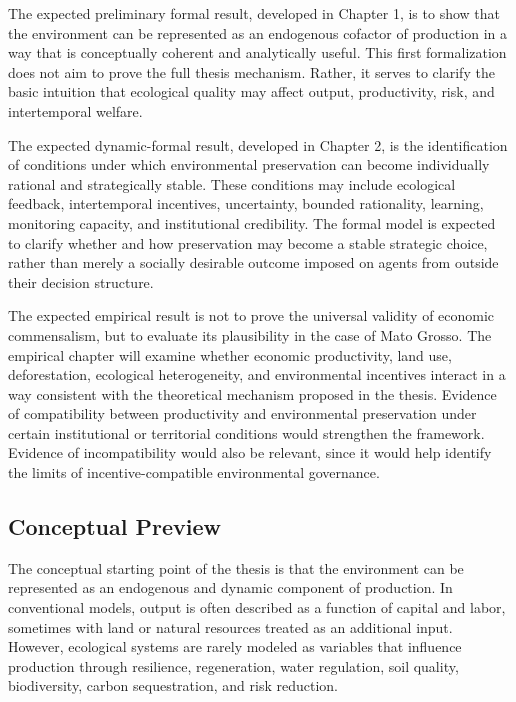 The expected preliminary formal result, developed in Chapter 1, is to show that the environment can be represented as an endogenous cofactor of production in a way that is conceptually coherent and analytically useful. This first formalization does not aim to prove the full thesis mechanism. Rather, it serves to clarify the basic intuition that ecological quality may affect output, productivity, risk, and intertemporal welfare.

The expected dynamic-formal result, developed in Chapter 2, is the identification of conditions under which environmental preservation can become individually rational and strategically stable. These conditions may include ecological feedback, intertemporal incentives, uncertainty, bounded rationality, learning, monitoring capacity, and institutional credibility. The formal model is expected to clarify whether and how preservation may become a stable strategic choice, rather than merely a socially desirable outcome imposed on agents from outside their decision structure.

The expected empirical result is not to prove the universal validity of economic commensalism, but to evaluate its plausibility in the case of Mato Grosso. The empirical chapter will examine whether economic productivity, land use, deforestation, ecological heterogeneity, and environmental incentives interact in a way consistent with the theoretical mechanism proposed in the thesis. Evidence of compatibility between productivity and environmental preservation under certain institutional or territorial conditions would strengthen the framework. Evidence of incompatibility would also be relevant, since it would help identify the limits of incentive-compatible environmental governance.

\subsection{Conceptual Preview}

The conceptual starting point of the thesis is that the environment can be represented as an endogenous and dynamic component of production. In conventional models, output is often described as a function of capital and labor, sometimes with land or natural resources treated as an additional input. However, ecological systems are rarely modeled as variables that influence production through resilience, regeneration, water regulation, soil quality, biodiversity, carbon sequestration, and risk reduction.

